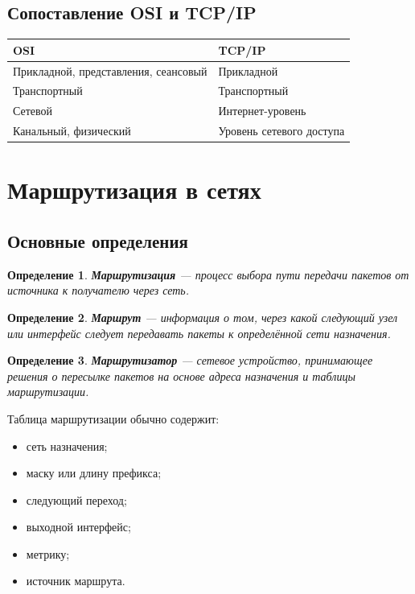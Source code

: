 \documentclass[12pt,a4paper]{article}
\newtheorem{definition}{Определение}
\begin{document}
\subsection{Сопоставление OSI и TCP/IP}

\begin{center}
\begin{tabular}{|p{}|p{}|}
\hline
\textbf{OSI} & \textbf{TCP/IP} \\
\hline
Прикладной, представления, сеансовый & Прикладной \\
\hline
Транспортный & Транспортный \\
\hline
Сетевой & Интернет-уровень \\
\hline
Канальный, физический & Уровень сетевого доступа \\
\hline
\end{tabular}
\end{center}

\section{Маршрутизация в сетях}

\subsection{Основные определения}

\begin{definition}
\textbf{Маршрутизация} --- процесс выбора пути передачи пакетов от источника к получателю через сеть.
\end{definition}

\begin{definition}
\textbf{Маршрут} --- информация о том, через какой следующий узел или интерфейс следует передавать пакеты к определённой сети назначения.
\end{definition}

\begin{definition}
\textbf{Маршрутизатор} --- сетевое устройство, принимающее решения о пересылке пакетов на основе адреса назначения и таблицы маршрутизации.
\end{definition}

Таблица маршрутизации обычно содержит:
\begin{itemize}
    \item сеть назначения;
    \item маску или длину префикса;
    \item следующий переход;
    \item выходной интерфейс;
    \item метрику;
    \item источник маршрута.
\end{itemize}
\end{document}
